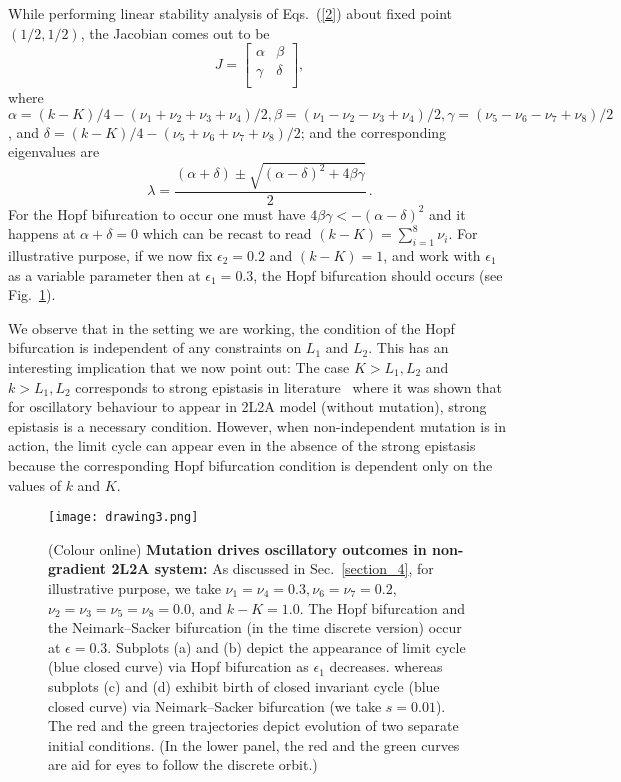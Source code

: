 \documentclass[
 pre,
 aps,
 a4paper,
 english,
 showkeys,
 reprint,
 twocolumn,
 superscriptaddress
]{revtex4}
\begin{document}
While performing linear stability analysis  of Eqs.~(\ref{2}) about fixed point $(1/2, 1/2)$, the Jacobian comes out to be
\begin{equation}
J=\begin{bmatrix}
\alpha & \beta\\ 
\gamma & \delta\\
\end{bmatrix},
\end{equation}
where $\alpha={(k-K)}/{4}-(\nu_1+\nu_2+\nu_3+\nu_4)/{2}, \beta=(\nu_1-\nu_2-\nu_3+\nu_4)/2, \gamma=(\nu_5-\nu_6-\nu_7+\nu_8)/2$, and $\delta={(k-K)}/{4}-(\nu_5+\nu_6+\nu_7+\nu_8)/2$; and the corresponding eigenvalues are
\begin{equation}\label{22}
\lambda=\frac{(\alpha+\delta)\pm \sqrt{(\alpha-\delta)^2+4\beta\gamma}}{2}\,.
\end{equation}
For the Hopf bifurcation to occur one must have $4\beta\gamma<-(\alpha-\delta)^2$ and it happens at $\alpha+\delta=0$ which can be recast to read $ (k-K)=\sum_{i=1}^{8} \nu_i$. For illustrative purpose, if we now fix $\epsilon_2=0.2$ and  $(k-K)=1$, and work with $\epsilon_1$ as a variable parameter then at $\epsilon_1=0.3$, the Hopf bifurcation should occurs (see Fig.~\ref{fig:1}). 

We observe that in the setting we are working, the condition of the Hopf bifurcation is independent of any constraints on $L_1$ and $L_2$. This has an interesting implication that we now point out: The case $K>L_1, L_2$ and $k>L_1,L_2$ corresponds to strong epistasis in literature~{\cite{hastings1981PNAS}} where it was shown that for oscillatory behaviour to appear in 2L2A model (without mutation), strong epistasis is a necessary condition. However, when non-independent mutation is in action, the limit cycle can appear even in the absence of the strong epistasis because the corresponding Hopf bifurcation condition is dependent only on the values of $k$ and $K$.
%
{\begin{figure}
		\centering
		\texttt{[image: drawing3.png]}\\
		\caption{(Colour online) {\bf  Mutation drives oscillatory outcomes in non-gradient 2L2A system:} As discussed in Sec.~\ref{section_4}, for illustrative purpose, we take $\nu_1=\nu_4=0.3, \nu_6=\nu_7=0.2$, $\nu_2=\nu_3=\nu_5=\nu_8=0.0$, and $k-K=1.0$. The Hopf bifurcation and the Neimark--Sacker bifurcation (in the time discrete version) occur at $\epsilon=0.3$. Subplots (a) and (b) depict the appearance of limit cycle (blue closed curve) via Hopf bifurcation as $\epsilon_1$ decreases. whereas subplots (c) and (d) exhibit birth of closed invariant cycle (blue closed curve) via Neimark--Sacker bifurcation (we take $s=0.01$). The red and the green trajectories depict evolution of two separate initial conditions. (In the lower panel, the red and the green curves are aid for eyes to follow the discrete orbit.)}
		\label{fig:1}
\end{figure}}
% 
\end{document}
